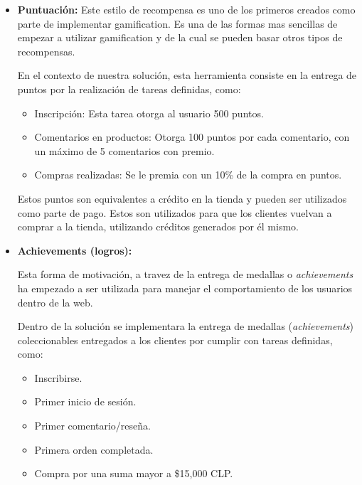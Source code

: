 \begin{itemize}
    \item {\bf Puntuación:}
	Este estilo de recompensa es uno de los primeros creados como parte de
	implementar gamification. Es una de las formas mas sencillas de empezar
 	a utilizar gamification\cite{OnlineComp} y de la cual se pueden basar otros tipos de recompensas.
	
        En el contexto de nuestra solución, esta herramienta consiste en la entrega de 
	puntos por la realización de tareas definidas, como:

    \begin{itemize}
        \item Inscripción:
            Esta tarea otorga al usuario 500 puntos.
        \item Comentarios en productos:
            Otorga 100 puntos por cada comentario, con un máximo de 5 comentarios
            con premio.
        \item Compras realizadas:
            Se le premia con un 10\% de la compra en puntos.
    \end{itemize}

        Estos puntos son equivalentes a crédito en la tienda y pueden ser
        utilizados como parte de pago.
        Estos son utilizados para que los clientes vuelvan a comprar a la tienda,
        utilizando créditos generados por él mismo.
	

    \item {\bf Achievements (logros):}
	
	Esta forma de motivación, a travez de la entrega de medallas o \emph{achievements}
	ha empezado a ser utilizada para manejar el comportamiento de los 
	usuarios dentro de la web\cite{BehaviorBadges}.
	
        Dentro de la solución se implementara la entrega de medallas (\emph{achievements})
	coleccionables entregados a los clientes por cumplir con tareas definidas, como:

        \begin{itemize}
            \item Inscribirse.
            \item Primer inicio de sesión.
            \item Primer comentario/reseña.
            \item Primera orden completada.
            \item Compra por una suma mayor a \$15,000 CLP.
        \end{itemize}


\end{itemize}
